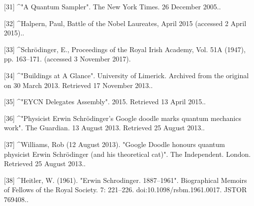 [31]
^"A Quantum Sampler". The New York Times. 26 December 2005..

[32]
^Halpern, Paul, Battle of the Nobel Laureates, April 2015 (accessed 2 April 2015)..

[33]
^Schrödinger, E., Proceedings of the Royal Irish Academy, Vol. 51A (1947), pp. 163–171. (accessed 3 November 2017).

[34]
^"Buildings at A Glance". University of Limerick. Archived from the original on 30 March 2013. Retrieved 17 November 2013..

[35]
^"EYCN Delegates Assembly". 2015. Retrieved 13 April 2015..

[36]
^"Physicist Erwin Schrödinger's Google doodle marks quantum mechanics work". The Guardian. 13 August 2013. Retrieved 25 August 2013..

[37]
^Williams, Rob (12 August 2013). "Google Doodle honours quantum physicist Erwin Schrödinger (and his theoretical cat)". The Independent. London. Retrieved 25 August 2013..

[38]
^Heitler, W. (1961). "Erwin Schrodinger. 1887–1961". Biographical Memoirs of Fellows of the Royal Society. 7: 221–226. doi:10.1098/rsbm.1961.0017. JSTOR 769408..